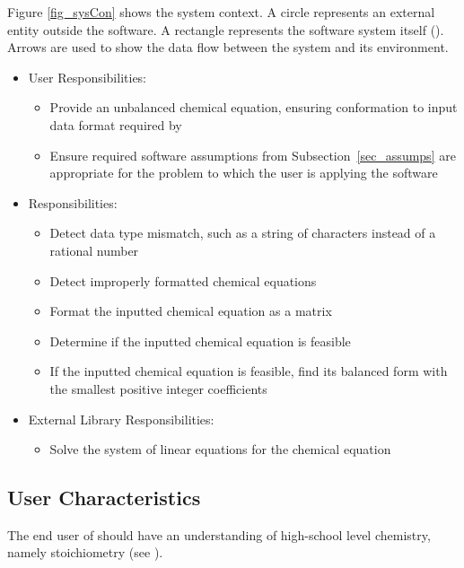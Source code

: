 \documentclass[12pt]{article}
\begin{document}
Figure \ref{fig_sysCon} shows the system context. A circle represents an
external entity outside the software. A rectangle represents the software system
itself (\progname{}). Arrows are used to show the data flow between the system
and its environment.

\begin{itemize}
  \item User Responsibilities:
        \begin{itemize}
          \item Provide an unbalanced chemical equation, ensuring conformation to input
                data format required by \progname{}
          \item Ensure required software assumptions from Subsection~\ref{sec_assumps}
                are appropriate for the problem to which the user is applying the software
        \end{itemize}
  \item \progname{} Responsibilities:
        \begin{itemize}
          \item Detect data type mismatch, such as a string of characters instead of a
                rational number
          \item Detect improperly formatted chemical equations
          \item Format the inputted chemical equation as a matrix
          \item Determine if the inputted chemical equation is feasible
          \item If the inputted chemical equation is feasible, find its balanced form with
                the smallest positive integer coefficients
        \end{itemize}
  \item External Library Responsibilities:
        \begin{itemize}
          \item Solve the system of linear equations for the chemical equation
        \end{itemize}
\end{itemize}

\subsection{User Characteristics} \label{sec_userChars}

The end user of \progname{} should have an understanding of high-school level
chemistry, namely stoichiometry (see ).
\end{document}
